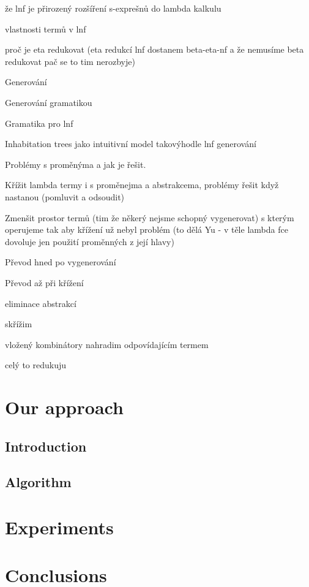 \documentclass[conference]{IEEEtran}
\begin{document}
že lnf je přirozený rozšíření s-exprešnů do lambda kalkulu

vlastnosti termů v lnf 

proč je eta redukovat (eta redukcí lnf dostanem beta-eta-nf a že nemusíme beta redukovat 
pač se to tim nerozbyje)

Generování

Generování gramatikou

Gramatika pro lnf

Inhabitation trees jako intuitivní model takovýhodle lnf generování

Problémy s proměnýma a jak je řešit.

Křížit lambda termy i s proměnejma a abstrakcema, problémy řešit když nastanou (pomluvit 
a odsoudit)

Zmenšit prostor termů (tim že někerý nejsme schopný vygenerovat) s kterým operujeme tak 
aby křížení už nebyl problém (to dělá Yu - v těle lambda fce dovoluje jen použití 
proměnných z její hlavy)

Převod hned po vygenerování

Převod až při křížení

eliminace abstrakcí

skřížim

vložený kombinátory nahradim odpovídajícím termem

celý to redukuju


\section{Our approach}
\label{approach}

\subsection{Introduction}



\subsection{Algorithm}

\section{Experiments}
\label{experiments}




\section{Conclusions}
\end{document}
